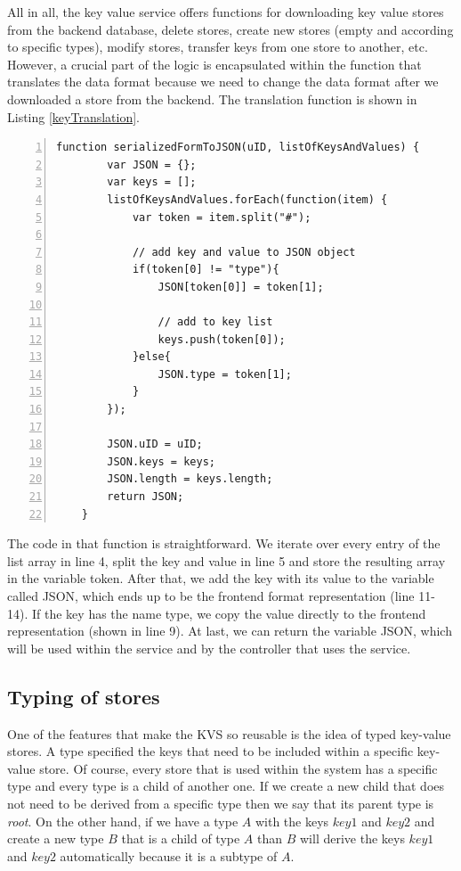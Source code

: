 All in all, the key value service offers functions for downloading key value stores from the backend database, delete stores, create new stores (empty and according to specific types), modify stores, transfer keys from one store to another, etc.  
However, a crucial part of the logic is encapsulated within the function that translates the data format because we need to change the data format after we downloaded a store from the backend. The translation function is shown in Listing \ref{keyTranslation}. 
 
\begin{lstlisting}[numbers=left,caption={The translation from the backend data format to the frontend data format within the key value service},label=keyTranslation,frame=tlbr,breaklines]
   function serializedFormToJSON(uID, listOfKeysAndValues) {
        var JSON = {};
        var keys = [];
        listOfKeysAndValues.forEach(function(item) {
            var token = item.split("#");

            // add key and value to JSON object
            if(token[0] != "type"){
                JSON[token[0]] = token[1];

                // add to key list
                keys.push(token[0]);
            }else{
                JSON.type = token[1];
            }
        });

        JSON.uID = uID;
        JSON.keys = keys;
        JSON.length = keys.length;
        return JSON;
    }
\end{lstlisting}

The code in that function is straightforward. We iterate over every entry of the list array in line 4, split the key and value in line 5 and store the resulting array in the variable token.
After that, we add the key with its value to the variable called JSON, which ends up to be the frontend format representation (line 11-14). If the key has the name type, we copy the value directly to the frontend representation (shown in line 9). At last, we can return the variable JSON, which will be used within the service and by the controller that uses the service.

\subsection{Typing of stores}
\label{typedKVS}
One of the features that make the \ac{KVS} so reusable is the idea of typed key-value stores. A type specified the keys that need to be included within a specific key-value store. Of course, every store that is used within the system has a specific type and every type is a child of another one. If we create a new child that does not need to be derived from a specific type then we say that its parent type is \emph{root}.
On the other hand, if we have a type $A$ with the keys $key1$ and $key2$ and create a new type $B$ that is a child of type $A$ than $B$ will derive the keys $key1$ and $key2$ automatically because it is a subtype of $A$.

